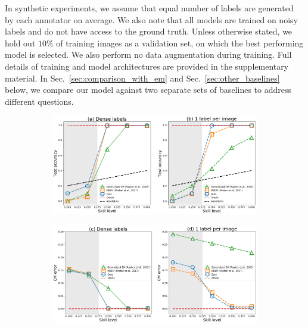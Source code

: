 In synthetic experiments, we assume that equal number of labels are generated by each annotator on average. We also note that all models are trained on noisy labels and do not have access to the ground truth. Unless otherwise stated, we hold out $10\%$ of training images as a validation set, on which the best performing model is selected. We also perform no data augmentation during training. Full details of training and model architectures are provided in the supplementary material. In Sec.~\ref{sec:comparison_with_em} and Sec.~\ref{sec:other_baselines} below, we compare our model against two separate sets of baselines to address different questions. 

\begin{figure}[ht]
	\center
	\begin{subfigure}[]{0.49\linewidth}
		\includegraphics[width=\linewidth]{chapter_4/figures/figures_new/figure_3_ab.png}
	\end{subfigure}
	\begin{subfigure}[]{0.49\linewidth}
		\includegraphics[width=\linewidth]{chapter_4/figures/figures_new/figure_3_cd.png}
	\end{subfigure}


\end{figure}
